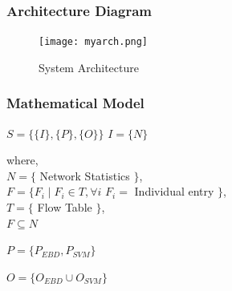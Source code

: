 \documentclass[10pt]{beamer}
\begin{document}
\begin{frame}
\frametitle{Architecture Diagram}
\begin{figure}[H]
\texttt{[image: myarch.png]}
\caption{System Architecture}
\end{figure}
\end{frame}

\begin{frame}
\frametitle{Mathematical Model}
\footnotesize
$S = \lbrace \lbrace I \rbrace ,\lbrace P \rbrace ,\lbrace O \rbrace \rbrace $\newline\newline
$I = \lbrace N \rbrace$

\noindent
where,\\
$N = \lbrace $ Network Statistics $ \rbrace $, \\
$F =\lbrace F_{i} \mid F_{i} \in T , \forall i$ $ F_{i} =$ Individual entry $ \rbrace$, \\
$T = \lbrace $ Flow Table $ \rbrace$, \\
$F \subseteq N$
\newline

$P = \lbrace P_{EBD}, P_{SVM} \rbrace$
\newline

$O = \lbrace O_{EBD} \cup O_{SVM} \rbrace$

\end{frame}
\end{document}
